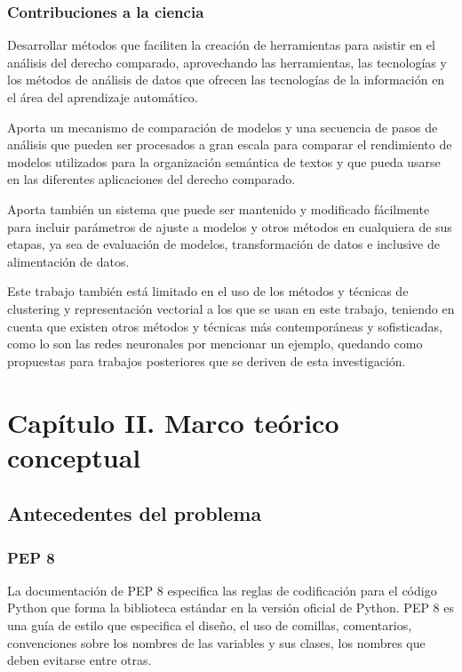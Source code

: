 \documentclass[12pt]{article}
\begin{document}
			\subsubsection{Contribuciones a la ciencia}
			Desarrollar métodos que faciliten la creación de herramientas para asistir en el análisis del derecho comparado, aprovechando las herramientas, las tecnologías y los métodos de análisis de datos que ofrecen las tecnologías de la información en el área del aprendizaje automático. 
		
			Aporta un mecanismo de comparación de modelos y una secuencia de pasos de análisis que pueden ser procesados a gran escala para comparar el rendimiento de modelos utilizados para la organización semántica de textos y que pueda usarse en las diferentes aplicaciones del derecho comparado.
			
			Aporta también un sistema que puede ser mantenido y modificado fácilmente para incluir parámetros de ajuste a modelos y otros métodos en cualquiera de sus etapas, ya sea de evaluación de modelos, transformación de datos e inclusive de alimentación de datos.
			
			Este trabajo también está limitado en el uso de los métodos y técnicas de clustering y representación vectorial a los que se usan en este trabajo, teniendo en cuenta que existen otros métodos y técnicas más contemporáneas y sofisticadas, como lo son las redes neuronales por mencionar un ejemplo, quedando como propuestas para trabajos posteriores que se deriven de esta investigación.
				
	\newpage
	\section{Capítulo II. Marco teórico conceptual}
		\subsection{Antecedentes del problema}
			\subsubsection{PEP 8}
			La documentación de PEP 8 especifica las reglas de codificación para el código Python que forma la biblioteca estándar en la versión oficial de Python. PEP 8 es una guía de estilo que especifica el diseño, el uso de comillas, comentarios, convenciones sobre los nombres de las variables y sus clases, los nombres que deben evitarse entre otras.\cite{Rossum2001}
			
\end{document}
